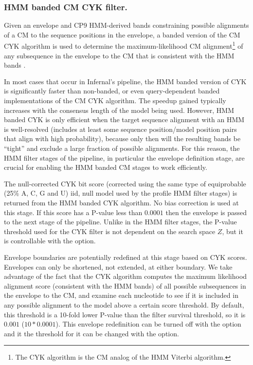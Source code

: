 \subsubsection{HMM banded CM CYK filter.}

Given an envelope and CP9 HMM-derived bands constraining possible
alignments of a CM to the sequence positions in the envelope, a banded
version of the CM CYK algorithm is used to determine the
maximum-likelihood CM alignment\footnote{The CYK algorithm is the CM
analog of the HMM Viterbi algorithm.} of any subsequence in the
envelope to the CM that is consistent with the HMM bands \citep{Nawrocki09b}.

In most cases that occur in Infernal's pipeline, the HMM banded
version of CYK is significantly faster than non-banded, or even
query-dependent banded \citep{NawrockiEddy07} implementations of the CM
CYK algorithm. The speedup gained typically increases with the
consensus length of the model being used. However, HMM banded CYK is
only efficient when the target sequence alignment with an HMM is
well-resolved (includes at least some sequence position/model position
pairs that align with high probability), because only then will 
the resulting bands be ``tight'' and exclude a large fraction of
possible alignments. For this reason, the HMM filter stages of the
pipeline, in particular the envelope definition stage, are crucial for
enabling the HMM banded CM stages to work efficiently. 

The null-corrected CYK bit score (corrected using the same type of
equiprobable (25\% A, C, G and U) iid, null model used by the profile
HMM filter stages) is returned from the HMM banded CYK algorithm. No
bias correction is used at this stage. If this score has a P-value
less than $0.0001$ then the envelope is passed to the next stage of
the pipeline. Unlike in the HMM filter stages, the P-value threshold
used for the CYK filter is not dependent on the search space $Z$, but
it is controllable with the  option.

Envelope boundaries are potentially redefined at this stage based on
CYK scores. Envelopes can only be shortened, not extended, at either
boundary. We take advantage of the fact that the CYK algorithm
computes the maximum likelihood alignment score (consistent with the
HMM bands) of all possible subsequences in the envelope to the CM, and
examine each nucleotide to see if it is included in any possible
alignment to the model above a certain score threshold. By default,
this threshold is a 10-fold lower P-value than the filter survival
threshold, so it is $0.001$ ($10*0.0001$). This envelope redefinition
can be turned off with the  option and it the
threshold for it can be changed with the  option.

